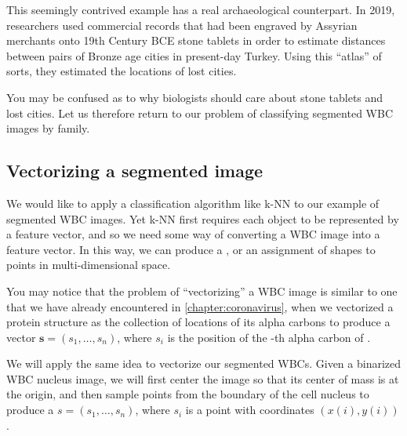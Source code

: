 \begin{qbox}\end{qbox}

This seemingly contrived example has a real archaeological counterpart. In 2019, researchers used commercial records that had been engraved by Assyrian merchants onto 19th Century BCE stone tablets in order to estimate distances between pairs of Bronze age cities in present-day Turkey. Using this ``atlas'' of sorts, they estimated the locations of lost cities.

You may be confused as to why biologists should care about stone tablets and lost cities. Let us therefore return to our problem of classifying segmented WBC images by family.

\FloatBarrier
{}
\subsection{Vectorizing a segmented image}

We would like to apply a classification algorithm like k-NN to our example of segmented WBC images. Yet k-NN first requires each object to be represented by a feature vector, and so we need some way of converting a WBC image into a feature vector. In this way, we can produce a , or an assignment of shapes to points in multi-dimensional space.

You may notice that the problem of ``vectorizing'' a WBC image is similar to one that we have already encountered in \autoref{chapter:coronavirus}, when we vectorized a protein structure  as the collection of locations of its  alpha carbons to produce a vector $\mathbf{s} = (s_1, \ldots, s_n)$, where $s_i$ is the position of the -th alpha carbon of .

We will apply the same idea to vectorize our segmented WBCs. Given a binarized WBC nucleus image, we will first center the image so that its center of mass is at the origin, and then sample  points from the boundary of the cell nucleus to produce a  $s = (s_1, \ldots, s_n)$, where $s_i$ is a point with coordinates $(x(i), y(i))$.\\

